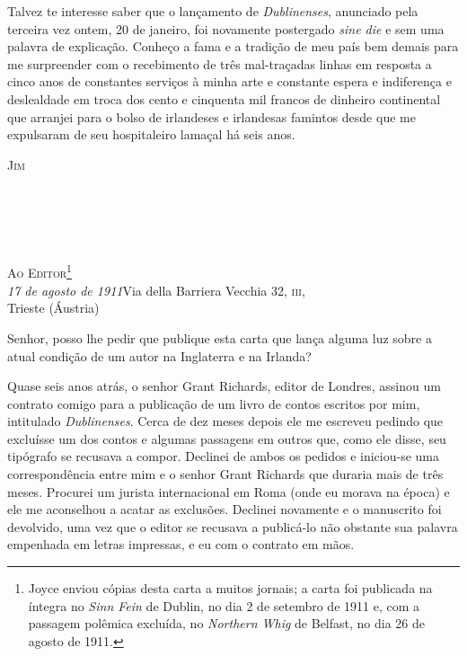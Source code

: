 \bigskip

Talvez te interesse saber que o lançamento de \textit{Dublinenses}, anunciado
pela terceira vez ontem, 20 de janeiro, foi novamente postergado \textit{sine
die} e sem uma palavra de explicação. Conheço a fama e a tradição de meu país
bem demais para me surpreender com o recebimento de três mal-traçadas linhas em
resposta a cinco anos de constantes serviços à minha arte e constante espera e
indiferença e deslealdade em troca dos cento e cinquenta mil francos de dinheiro
continental que arranjei para o bolso de irlandeses e irlandesas famintos desde
que me expulsaram de seu hospitaleiro lamaçal há seis anos.

\medskip

{\raggedleft\scshape
Jim
\par}


\clearpage

\openany


\chapter*{\ }

{\raggedright\large
\textsc{Ao Editor}\footnote{ Joyce enviou cópias desta carta a muitos jornais; a carta foi
publicada na íntegra no \textit{Sinn Fein} de Dublin, no dia 2 de setembro de
1911 e, com a passagem polêmica excluída, no \textit{Northern Whig} de Belfast,
no dia 26 de agosto de 1911.}\\\smallskip\normalsize
\textit{17 de agosto de 1911}\hfill Via della Barriera Vecchia 32, \textsc{iii},\\\raggedleft Trieste (Áustria)
\par}

\bigskip

Senhor, posso lhe pedir que publique esta carta que lança alguma luz sobre a
atual condição de um autor na Inglaterra e na Irlanda?

Quase seis anos atrás, o senhor Grant Richards, editor de Londres, assinou um
contrato comigo para a publicação de um livro de contos escritos por mim,
intitulado \textit{Dublinenses}. Cerca de dez meses depois ele me escreveu
pedindo que excluísse um dos contos e algumas passagens em outros que, como ele
disse, seu tipógrafo se recusava a compor. Declinei de ambos os pedidos e
iniciou-se uma correspondência entre mim e o senhor Grant Richards que duraria
mais de três meses. Procurei um jurista internacional em Roma (onde eu morava na
época) e ele me aconselhou a acatar as exclusões. Declinei novamente e o
manuscrito foi devolvido, uma vez que o editor se recusava a publicá-lo não
obstante sua palavra empenhada em letras impressas, e eu com o contrato em mãos.

